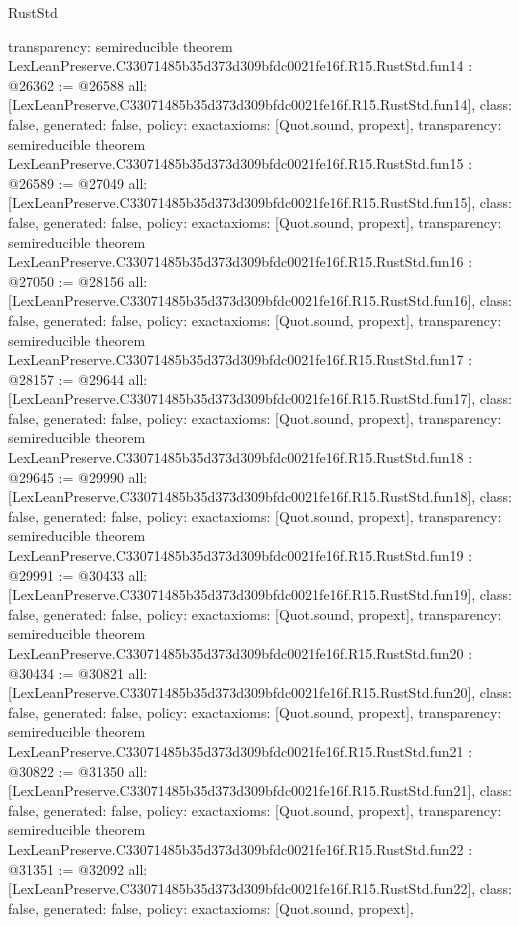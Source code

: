 \begin{lexlean}{RustStd}
\begin{coremodule}
{  transparency: semireducible
}
theorem LexLeanPreserve.C33071485b35d373d309bfdc0021fe16f.R15.RustStd.fun14 : @26362 := @26588 {
  all: [LexLeanPreserve.C33071485b35d373d309bfdc0021fe16f.R15.RustStd.fun14],
  class: false,
  generated: false,
  policy: exact{axioms: [Quot.sound, propext]},
  transparency: semireducible
}
theorem LexLeanPreserve.C33071485b35d373d309bfdc0021fe16f.R15.RustStd.fun15 : @26589 := @27049 {
  all: [LexLeanPreserve.C33071485b35d373d309bfdc0021fe16f.R15.RustStd.fun15],
  class: false,
  generated: false,
  policy: exact{axioms: [Quot.sound, propext]},
  transparency: semireducible
}
theorem LexLeanPreserve.C33071485b35d373d309bfdc0021fe16f.R15.RustStd.fun16 : @27050 := @28156 {
  all: [LexLeanPreserve.C33071485b35d373d309bfdc0021fe16f.R15.RustStd.fun16],
  class: false,
  generated: false,
  policy: exact{axioms: [Quot.sound, propext]},
  transparency: semireducible
}
theorem LexLeanPreserve.C33071485b35d373d309bfdc0021fe16f.R15.RustStd.fun17 : @28157 := @29644 {
  all: [LexLeanPreserve.C33071485b35d373d309bfdc0021fe16f.R15.RustStd.fun17],
  class: false,
  generated: false,
  policy: exact{axioms: [Quot.sound, propext]},
  transparency: semireducible
}
theorem LexLeanPreserve.C33071485b35d373d309bfdc0021fe16f.R15.RustStd.fun18 : @29645 := @29990 {
  all: [LexLeanPreserve.C33071485b35d373d309bfdc0021fe16f.R15.RustStd.fun18],
  class: false,
  generated: false,
  policy: exact{axioms: [Quot.sound, propext]},
  transparency: semireducible
}
theorem LexLeanPreserve.C33071485b35d373d309bfdc0021fe16f.R15.RustStd.fun19 : @29991 := @30433 {
  all: [LexLeanPreserve.C33071485b35d373d309bfdc0021fe16f.R15.RustStd.fun19],
  class: false,
  generated: false,
  policy: exact{axioms: [Quot.sound, propext]},
  transparency: semireducible
}
theorem LexLeanPreserve.C33071485b35d373d309bfdc0021fe16f.R15.RustStd.fun20 : @30434 := @30821 {
  all: [LexLeanPreserve.C33071485b35d373d309bfdc0021fe16f.R15.RustStd.fun20],
  class: false,
  generated: false,
  policy: exact{axioms: [Quot.sound, propext]},
  transparency: semireducible
}
theorem LexLeanPreserve.C33071485b35d373d309bfdc0021fe16f.R15.RustStd.fun21 : @30822 := @31350 {
  all: [LexLeanPreserve.C33071485b35d373d309bfdc0021fe16f.R15.RustStd.fun21],
  class: false,
  generated: false,
  policy: exact{axioms: [Quot.sound, propext]},
  transparency: semireducible
}
theorem LexLeanPreserve.C33071485b35d373d309bfdc0021fe16f.R15.RustStd.fun22 : @31351 := @32092 {
  all: [LexLeanPreserve.C33071485b35d373d309bfdc0021fe16f.R15.RustStd.fun22],
  class: false,
  generated: false,
  policy: exact{axioms: [Quot.sound, propext]},
}
\end{coremodule}
\end{lexlean}
